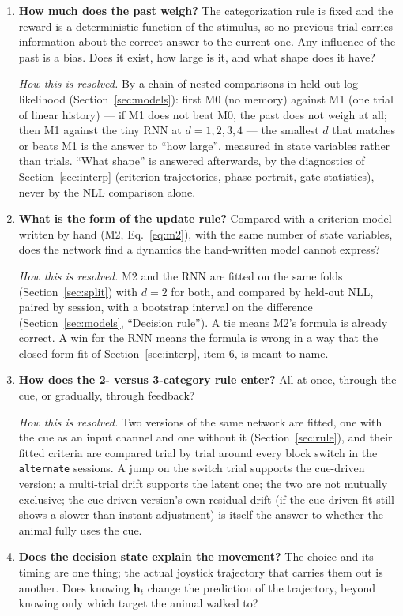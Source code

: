\documentclass[11pt,a4paper]{article}
\newcommand{\vect}[1]{\bm{#1}}
\begin{document}
\begin{enumerate}[leftmargin=*]
\item \textbf{How much does the past weigh?} The categorization rule is fixed and the
      reward is a deterministic function of the stimulus, so no previous trial carries
      information about the correct answer to the current one. Any influence of the past
      is a bias. Does it exist, how large is it, and what shape does it have?

      \emph{How this is resolved.} By a chain of nested comparisons in held-out
      log-likelihood (Section~\ref{sec:models}): first M0 (no memory) against M1 (one
      trial of linear history) — if M1 does not beat M0, the past does not weigh at all;
      then M1 against the tiny RNN at $d = 1, 2, 3, 4$ — the smallest $d$ that matches or
      beats M1 is the answer to ``how large'', measured in state variables rather than
      trials. ``What shape'' is answered afterwards, by the diagnostics of
      Section~\ref{sec:interp} (criterion trajectories, phase portrait, gate statistics),
      never by the NLL comparison alone.
\item \textbf{What is the form of the update rule?} Compared with a criterion model
      written by hand (M2, Eq.~\eqref{eq:m2}), with the same number of state variables,
      does the network find a dynamics the hand-written model cannot express?

      \emph{How this is resolved.} M2 and the RNN are fitted on the same folds
      (Section~\ref{sec:split}) with $d = 2$ for both, and compared by held-out NLL,
      paired by session, with a bootstrap interval on the difference
      (Section~\ref{sec:models}, ``Decision rule''). A tie means M2's formula is already
      correct. A win for the RNN means the formula is wrong in a way that the closed-form
      fit of Section~\ref{sec:interp}, item 6, is meant to name.
\item \textbf{How does the 2- versus 3-category rule enter?} All at once, through the
      cue, or gradually, through feedback?

      \emph{How this is resolved.} Two versions of the same network are fitted, one
      with the cue as an input channel and one without it (Section~\ref{sec:rule}), and
      their fitted criteria are compared trial by trial around every block switch in the
      \texttt{alternate} sessions. A jump on the switch trial supports the cue-driven
      version; a multi-trial drift supports the latent one; the two are not mutually
      exclusive; the cue-driven version's own residual drift (if the cue-driven fit still
      shows a slower-than-instant adjustment) is itself the answer to whether the animal
      fully uses the cue.
\item \textbf{Does the decision state explain the movement?} The choice and its timing
      are one thing; the actual joystick trajectory that carries them out is another.
      Does knowing $\vect{h}_t$ change the prediction of the trajectory, beyond knowing
      only which target the animal walked to?


\end{enumerate}
\end{document}
